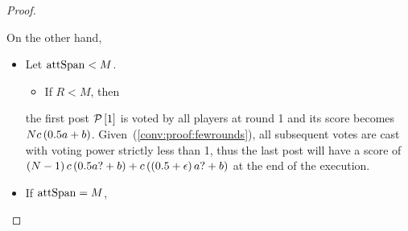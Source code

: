 \begin{proof}
\begin{itemize}
    On the other hand,
    \begin{itemize}
      \item Let $\mathrm{attSpan} < M$.
      \begin{itemize}
        \item If $R < M$, then
      \end{itemize}
      the first post $\mathcal{P}\left[1\right]$ is voted
      by all players at round 1 and its score becomes $N c \left(0.5a +
      b\right)$. Given~(\ref{conv:proof:fewrounds}), all subsequent votes are
      cast with voting power strictly less than 1, thus the last post will have
      a score of $\left(N - 1\right) c \left(0.5a? + b\right) + c
      \left(\left(0.5 + \epsilon\right)a? + b\right)$ at the end of the
      execution.
      \item If $\mathrm{attSpan} = M$,
    \end{itemize}
  \end{itemize}
\end{proof}
